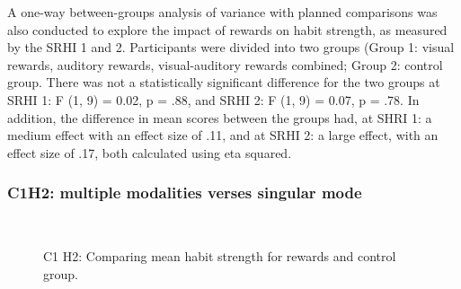 \documentclass{scaffold/sigchi}
\begin{document}
A one-way between-groups analysis of variance with planned comparisons was also conducted to explore the impact of rewards on habit strength, as measured by the SRHI 1 and 2. Participants were divided into two groups (Group 1: visual rewards, auditory rewards, visual-auditory rewards combined; Group 2: control group. There was not a
statistically significant difference for the two groups at SRHI 1: F (1, 9) = 0.02, p = .88, and SRHI 2: F (1, 9) = 0.07, p = .78. In addition, the difference in mean scores between the groups had, at SHRI 1: a medium effect with an effect size of .11, and at SRHI 2: a large effect, with an effect size of .17, both calculated using eta squared.

\subsubsection{C1H2: multiple modalities verses singular mode}


\begin{figure}
  \centering
  \caption{C1 H2: Comparing mean habit strength for rewards and control group.}~\label{fig:habit_4_item_survey1_v_survey2}
\end{figure}
\end{document}
